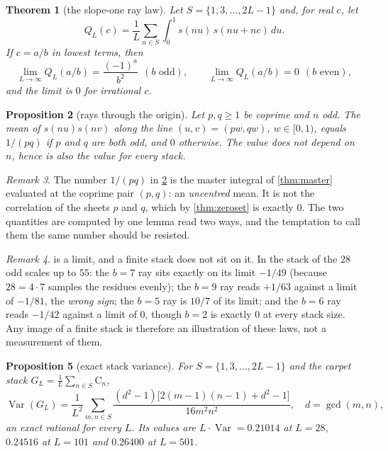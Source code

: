 \documentclass[11pt]{amsart}
\newtheorem{theorem}{Theorem}[section]
\newtheorem{proposition}[theorem]{Proposition}
\theoremstyle{definition}
\theoremstyle{remark}
\newtheorem{remark}[theorem]{Remark}
\begin{document}
\begin{theorem}[the slope-one ray law]
\label{thm:ray}
Let $S=\{1,3,\dots,2L-1\}$ and, for real $c$, let
\[
Q_L(c)=\frac1L\sum_{n\in S}\int_0^1 s(nu)\,s(nu+nc)\,du .
\]
If $c=a/b$ in lowest terms, then
\[
\lim_{L\to\infty}Q_L(a/b)=\frac{(-1)^a}{b^2}\ \ (b\text{ odd}),\qquad
\lim_{L\to\infty}Q_L(a/b)=0\ \ (b\text{ even}),
\]
and the limit is $0$ for irrational $c$.
\end{theorem}

\begin{proposition}[rays through the origin]
\label{prop:origin}
Let $p,q\ge1$ be coprime and $n$ odd. The mean of $s(nu)s(nv)$ along the line $(u,v)=(pw,qw)$, $w\in[0,1)$, equals $1/(pq)$ if $p$ and $q$ are both odd, and $0$ otherwise. The value does not depend on $n$, hence is also the value for every stack.
\end{proposition}

\begin{remark}
\label{rem:notacorr}
The number $1/(pq)$ in \cref{prop:origin} is the master integral of \cref{thm:master} evaluated at the coprime pair $(p,q)$: an \emph{uncentred} mean. It is not the correlation of the sheets $p$ and $q$, which by \cref{thm:zeroset} is exactly $0$. The two quantities are computed by one lemma read two ways, and the temptation to call them the same number should be resisted.
\end{remark}

\begin{remark}
\label{rem:finiteN}
 is a limit, and a finite stack does not sit on it. In the stack of the $28$ odd scales up to $55$: the $b=7$ ray sits exactly on its limit $-1/49$ (because $28=4\cdot7$ samples the residues evenly); the $b=9$ ray reads $+1/63$ against a limit of $-1/81$, the \emph{wrong sign}; the $b=5$ ray is $10/7$ of its limit; and the $b=6$ ray reads $-1/42$ against a limit of $0$, though $b=2$ is exactly $0$ at every stack size. Any image of a finite stack is therefore an illustration of these laws, not a measurement of them.
\end{remark}

\begin{proposition}[exact stack variance]
\label{prop:variance}
For $S=\{1,3,\dots,2L-1\}$ and the carpet stack $G_L=\frac1L\sum_{n\in S}\mathrm{C}_n$,
\[
\operatorname{Var}(G_L)=\frac1{L^2}\sum_{m,n\in S}\frac{(d^2-1)\bigl[2(m-1)(n-1)+d^2-1\bigr]}{16m^2n^2},\quad d=\gcd(m,n),
\]
an exact rational for every $L$. Its values are $L\cdot\operatorname{Var}=0.21014$ at $L=28$, $0.24516$ at $L=101$ and $0.26400$ at $L=501$.
\end{proposition}
\end{document}
